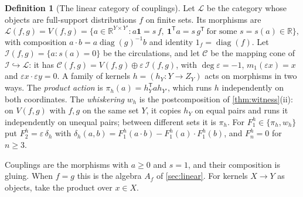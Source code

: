 \documentclass[11pt]{article}
\theoremstyle{definition}
\newtheorem{definition}[theorem]{Definition}
\theoremstyle{remark}
\begin{document}
\begin{definition}[The linear category of couplings]\label{def:Lcat}
Let $\mathcal L$ be the category whose objects are full-support distributions $f$ on finite sets. Its morphisms are
\[
\mathcal L(f,g)=V(f,g)=\{a\in\mathbb R^{Y\times Y'}: a\mathbf 1=s\,f,\ \mathbf 1^{\mathsf T}a=s\,g^{\mathsf T}\ \text{for some }s=s(a)\in\mathbb R\},
\]
with composition $a\cdot b=a\operatorname{diag}(g)^{-1}b$ and identity $1_f=\operatorname{diag}(f)$. Let $\mathcal I(f,g)=\{a: s(a)=0\}$
be the circulations, and let $\mathcal C$ be the mapping cone of $\mathcal I\hookrightarrow\mathcal L$: it has
$\mathcal C(f,g)=V(f,g)\oplus\varepsilon\,\mathcal I(f,g)$, with $\deg\varepsilon=-1$, $m_1(\varepsilon x)=x$ and
$\varepsilon x\cdot\varepsilon y=0$. A family of kernels $h=(h_Y\colon Y\to Z_Y)$ acts on morphisms in two ways. The
\emph{product action} is $\pi_h(a)=h_Y^{\mathsf T}ah_{Y'}$, which runs $h$ independently on both coordinates. The
\emph{whiskering} $w_h$ is the postcomposition of \cref{thm:witness}(ii): on $V(f,g)$ with $f,g$ on the same set $Y$, it copies
$h_Y$ on equal pairs and runs it independently on unequal pairs; between different sets it is $\pi_h$. For $F_1^h\in\{\pi_h,w_h\}$
put $F^h_2=\varepsilon\,\delta_h$ with $\delta_h(a,b)=F_1^h(a\cdot b)-F_1^h(a)\cdot F_1^h(b)$, and $F^h_n=0$ for $n\ge3$.
\end{definition}

Couplings are the morphisms with $a\ge0$ and $s=1$, and their composition is gluing. When $f=g$ this is the algebra $A_f$
of \cref{sec:linear}. For kernels $X\to Y$ as objects, take the product over $x\in X$.
\end{document}
